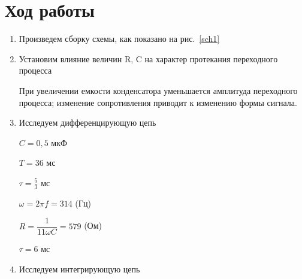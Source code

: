 \section{Ход работы}

\begin{enumerate}

\item{Произведем сборку схемы, как показано на рис.~\ref{sch1}}


\item{Установим влияние величин R, C на характер протекания переходного процесса}

При увеличении емкости конденсатора уменьшается амплитуда переходного процесса; изменение сопротивления приводит к изменению формы сигнала.

\item{Исследуем дифференцирующую цепь}
\begin{multicols}{2}
\begin{center}

$ C = 0,5 $ мкФ

$ T = 36 $ мс

\vspace{40mm}

$ \tau = \frac{5}{3} $ мс

$ \omega = 2 \pi f = 314 $ (Гц)

$ R = \dfrac{1}{11\omega C} = 579 $ (Ом)

\vspace{40mm}

$\tau = 6 $ мс

\end{center}
\end{multicols}

\item{Исследуем интегрирующую цепь}


\end{enumerate}
